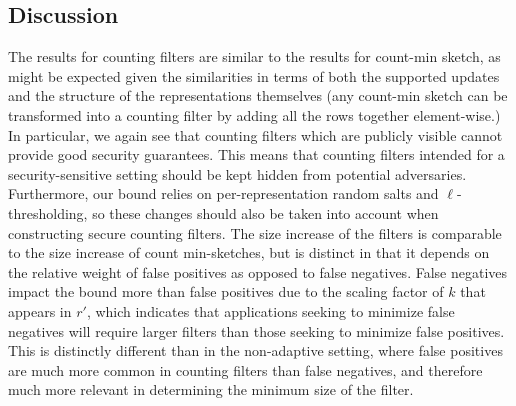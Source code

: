 \subsection{Discussion}
The results for counting filters are similar to the results for count-min
sketch, as might be expected given the similarities in terms of both the
supported updates and the structure of the representations themselves (any
count-min sketch can be transformed into a counting filter by adding all the
rows together element-wise.) In particular, we again see that counting filters
which are publicly visible cannot provide good security guarantees. This means
that counting filters intended for a security-sensitive setting should be kept
hidden from potential adversaries. Furthermore, our bound relies on
per-representation random salts and $\ell$-thresholding, so these changes should
also be taken into account when constructing secure counting filters. The size
increase of the filters is comparable to the size increase of count
min-sketches, but is distinct in that it depends on the relative weight of false
positives as opposed to false negatives. False negatives impact the bound more
than false positives due to the scaling factor of $k$ that appears in $r'$,
which indicates that applications seeking to minimize false negatives will
require larger filters than those seeking to minimize false positives. This is
distinctly different than in the non-adaptive setting, where false positives are
much more common in counting filters than false negatives, and therefore much
more relevant in determining the minimum size of the filter.
